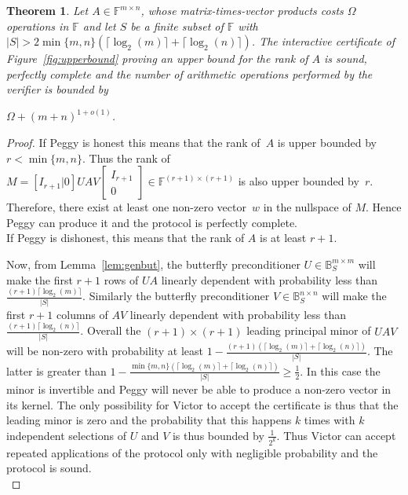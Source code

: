 \documentclass{article}
\newtheorem{theorem}{Theorem}
\newcommand{\F}{\ensuremath{\mathbb F}}
\newcommand{\B}{\ensuremath{\mathbb B}}
\newcommand{\card}[1]{\ensuremath{\left|#1\right|}\xspace}
\begin{document}
\begin{theorem}\label{thm:upper}  
  Let $A\in\F^{m\times n}$, whose matrix-times-vector products costs $\Omega$
  operations in $\F$ and let $S$ be a finite subset of $\F$ with 
  $\card{S}> 2\min\{m,n\}(\lceil\log_2(m)\rceil+\lceil\log_2(n)\rceil)$.  
  The interactive certificate of Figure~\ref{fig:upperbound} proving an
  upper bound for the rank of $A$ is sound, perfectly complete and the number of
  arithmetic operations performed by the verifier is bounded by
   
   
  $\Omega+(m+n)^{1+o(1)}$.
\end{theorem}
\begin{proof}
  If Peggy is honest this means that the rank of~$A$ is upper bounded by
  $r<\min\{m,n\}$. Thus the rank of 
  $M=\left[ I_{r+1}|0 \right] U A V \left[\begin{array}{cc}I_{r+1}\\0\end{array}
  \right]\in\F^{(r+1)\times (r+1)}$ is also upper bounded by~$r$. 
  Therefore, there exist at least one non-zero vector~$w$ in the nullspace of
  $M$. Hence Peggy can produce it and the protocol is perfectly complete.\\
   
  If Peggy is dishonest, this means that the rank of $A$ is at least $r+1$.
   
  Now, from Lemma~\ref{lem:genbut}, 
  the butterfly preconditioner $U\in\B_S^{m\times m}$ will make the first $r+1$
  rows of $UA$ linearly dependent with probability less than
  $\frac{(r+1)\lceil\log_2(m)\rceil}{\card{S}}$. Similarly the butterfly preconditioner
  $V\in\B_S^{n\times n}$ will make the first $r+1$ columns of $AV$ linearly
  dependent with probability less  than 
  $\frac{(r+1)\lceil\log_2(n)\rceil}{\card{S}}$. 
  Overall the $(r+1)\times(r+1)$ leading principal minor of $UAV$ will be non-zero
  with probability at least
  $1-\frac{(r+1)(\lceil\log_2(m)\rceil+\lceil\log_2(n)\rceil)}{\card{S}}$.
  The latter is greater than
  $1-\frac{\min\{m,n\}(\lceil\log_2(m)\rceil+\lceil\log_2(n)\rceil)}{\card{S}}\geq \frac{1}{2}$.
  In this case the minor is
  invertible and Peggy will never be able to produce a non-zero vector in its
  kernel. The only possibility for Victor to accept the certificate is thus that
  the leading minor is zero and the probability that this happens $k$ times with
  $k$ independent selections of $U$ and $V$ is thus bounded by $\frac{1}{2^k}$. 
  Thus Victor can accept repeated applications of the protocol only with
  negligible probability and the protocol is sound.\\
  

\end{proof}
\end{document}
